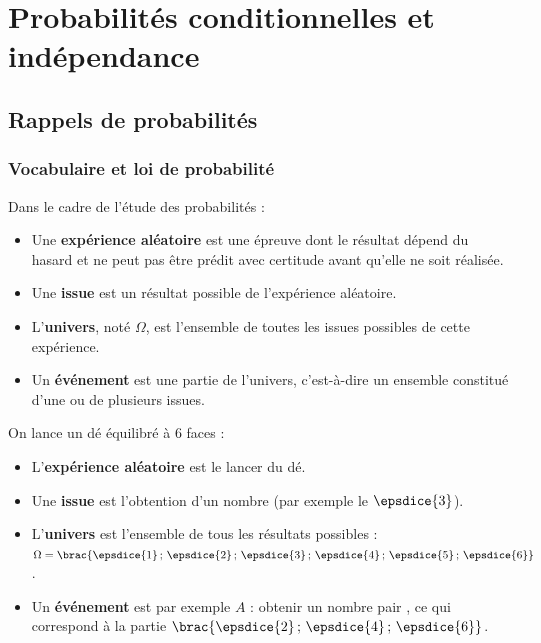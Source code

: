 \chapter{Probabilités conditionnelles et indépendance}

\section{Rappels de probabilités}

\subsection{Vocabulaire et loi de probabilité}

\begin{defin}
	Dans le cadre de l'étude des probabilités :

	\begin{itemize}
		\item Une \textbf{expérience aléatoire} est une épreuve dont le résultat dépend du hasard et ne peut pas être prédit avec certitude avant qu'elle ne soit réalisée.
		\item Une \textbf{issue} est un résultat possible de l'expérience aléatoire.
		\item L'\textbf{univers}, noté $\Omega$, est l'ensemble de toutes les issues possibles de cette expérience.
		\item Un \textbf{événement} est une partie de l'univers, c'est-à-dire un ensemble constitué d'une ou de plusieurs issues.
	\end{itemize}
\end{defin}

\begin{ex}
	On lance un dé équilibré à 6 faces :

	\begin{itemize}
		\item L'\textbf{expérience aléatoire} est le lancer du dé.
		\item Une \textbf{issue} est l'obtention d'un nombre (par exemple le $\epsdice{3}$).
		\item L'\textbf{univers} est l'ensemble de tous les résultats possibles : $\Omega = \brac{\epsdice{1}\,;\,\epsdice{2}\,;\,\epsdice{3}\,;\,\epsdice{4}\,;\,\epsdice{5}\,;\,\epsdice{6}}$.
		\item Un \textbf{événement} est par exemple $A$ : \og obtenir un nombre pair \fg{}, ce qui correspond à la partie $\brac{\epsdice{2}\,;\,\epsdice{4}\,;\,\epsdice{6}}$.
	\end{itemize}
\end{ex}

